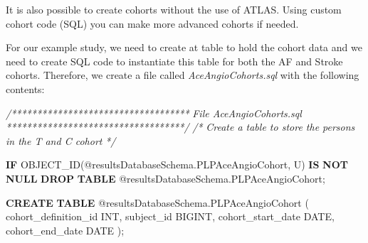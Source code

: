 \documentclass[
]{article}
\newenvironment{Shaded}{\begin{snugshade}}{\end{snugshade}}
\newcommand{\CommentTok}[1]{\textcolor[rgb]{0.56,0.35,0.01}{\textit{#1}}}
\newcommand{\ControlFlowTok}[1]{\textcolor[rgb]{0.13,0.29,0.53}{\textbf{#1}}}
\newcommand{\DataTypeTok}[1]{\textcolor[rgb]{0.13,0.29,0.53}{#1}}
\newcommand{\KeywordTok}[1]{\textcolor[rgb]{0.13,0.29,0.53}{\textbf{#1}}}
\newcommand{\NormalTok}[1]{#1}
\newcommand{\StringTok}[1]{\textcolor[rgb]{0.31,0.60,0.02}{#1}}
\begin{document}
It is also possible to create cohorts without the use of ATLAS. Using
custom cohort code (SQL) you can make more advanced cohorts if needed.

For our example study, we need to create at table to hold the cohort
data and we need to create SQL code to instantiate this table for both
the AF and Stroke cohorts. Therefore, we create a file called
\emph{AceAngioCohorts.sql} with the following contents:

\begin{Shaded}
\begin{Highlighting}[]
  \CommentTok{/***********************************}
\CommentTok{    File AceAngioCohorts.sql }
\CommentTok{  ***********************************/}
    \CommentTok{/*}
\CommentTok{    Create a table to store the persons in the T and C cohort}
\CommentTok{  */}
    
    \ControlFlowTok{IF}\NormalTok{ OBJECT\_ID(}\StringTok{\textquotesingle{}@resultsDatabaseSchema.PLPAceAngioCohort\textquotesingle{}}\NormalTok{, }\StringTok{\textquotesingle{}U\textquotesingle{}}\NormalTok{) }\KeywordTok{IS} \KeywordTok{NOT} \KeywordTok{NULL} 
  \KeywordTok{DROP} \KeywordTok{TABLE}\NormalTok{ @resultsDatabaseSchema.PLPAceAngioCohort;}
  
  \KeywordTok{CREATE} \KeywordTok{TABLE}\NormalTok{ @resultsDatabaseSchema.PLPAceAngioCohort }
\NormalTok{  ( }
\NormalTok{    cohort\_definition\_id }\DataTypeTok{INT}\NormalTok{, }
\NormalTok{    subject\_id BIGINT,}
\NormalTok{    cohort\_start\_date }\DataTypeTok{DATE}\NormalTok{, }
\NormalTok{    cohort\_end\_date }\DataTypeTok{DATE}
\NormalTok{  );}
  

\end{Highlighting}
\end{Shaded}
\end{document}
